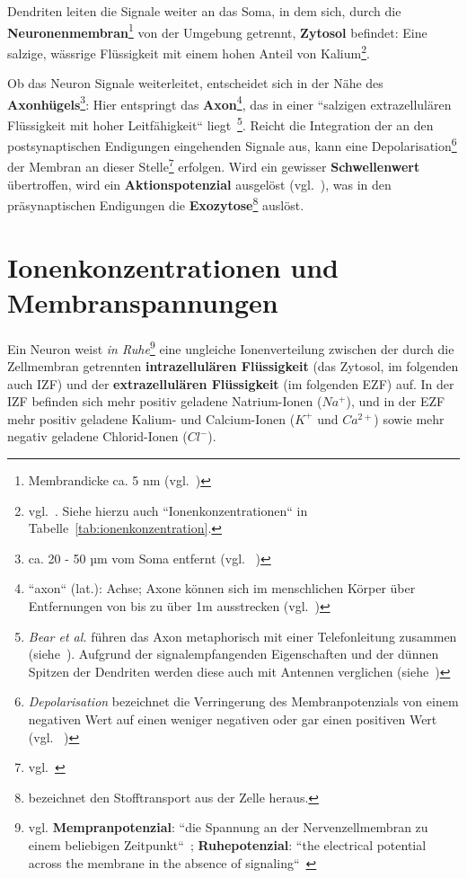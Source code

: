 Dendriten leiten die Signale weiter an das Soma, in dem sich, durch die \textbf{Neuronenmembran}\footnote{
 Membrandicke ca. 5 nm (vgl.~\cite[66]{FE19})
} von der Umgebung getrennt, \textbf{Zytosol} befindet: Eine salzige, wässrige Flüssigkeit mit einem hohen Anteil von Kalium\footnote{vgl.~\cite[29]{BCP18}. Siehe hierzu auch ``Ionenkonzentrationen`` in Tabelle~\ref{tab:ionenkonzentration}.
}.

Ob das Neuron Signale weiterleitet, entscheidet sich in der Nähe des \textbf{Axonhügels}\footnote{
 ca. 20 - 50 µm vom Soma entfernt (vgl. ~\cite[77]{Jon19})
}: Hier entspringt das \textbf{Axon}\footnote{
 ``axon`` (lat.): Achse; Axone können sich im menschlichen Körper über Entfernungen von bis zu über 1m ausstrecken (vgl.~\cite[28]{BCP18})
}, das in einer ``salzigen extrazellulären Flüssigkeit mit hoher Leitfähigkeit`` liegt~\cite[61]{BCP18}\footnote{
 \textit{Bear et al.} führen das Axon metaphorisch mit einer Telefonleitung zusammen (siehe~\cite[43]{BCP18}). Aufgrund der signalempfangenden Eigenschaften und der dünnen Spitzen der Dendriten werden diese auch mit Antennen verglichen (siehe~\cite[28]{BCP18})
}.
Reicht die Integration der an den postsynaptischen Endigungen eingehenden Signale aus, kann eine Depolarisation\footnote{
  \textit{Depolarisation} bezeichnet die Verringerung des Membranpotenzials von einem negativen Wert auf einen weniger negativen oder gar einen positiven Wert (vgl. ~\cite[95 f.]{SBB+13})
} der Membran an dieser Stelle\footnote{vgl.~\cite[61]{Eil19}} erfolgen. Wird ein gewisser \textbf{Schwellenwert} übertroffen, wird ein \textbf{Aktionspotenzial} ausgelöst (vgl.~\cite[142 f.]{BCP18}), was in den präsynaptischen Endigungen die \textbf{Exozytose}\footnote{
  bezeichnet den Stofftransport aus der Zelle heraus.
} auslöst.


\section{Ionenkonzentrationen und Membranspannungen}\label{sec-ionenkonzentrationen}

Ein Neuron weist \textit{in Ruhe}\footnote{
 vgl. \textbf{Mempranpotenzial}: ``die Spannung an der Nervenzellmembran zu einem beliebigen Zeitpunkt``~\cite[70]{BCP18}; \textbf{Ruhepotenzial}: ``the electrical potential across the membrane in the absence of signaling``~\cite[126]{KSJ+13}
} eine ungleiche Ionenverteilung zwischen der durch die Zellmembran getrennten \textbf{intrazellulären Flüssigkeit} (das Zytosol, im folgenden auch IZF) und der \textbf{extrazellulären Flüssigkeit} (im folgenden EZF) auf.
In der IZF befinden sich mehr positiv geladene Natrium-Ionen ($Na^+$), und in der EZF mehr positiv geladene Kalium- und Calcium-Ionen ($K^+$ und $Ca^{2+}$) sowie mehr negativ geladene Chlorid-Ionen ($Cl^-$).

